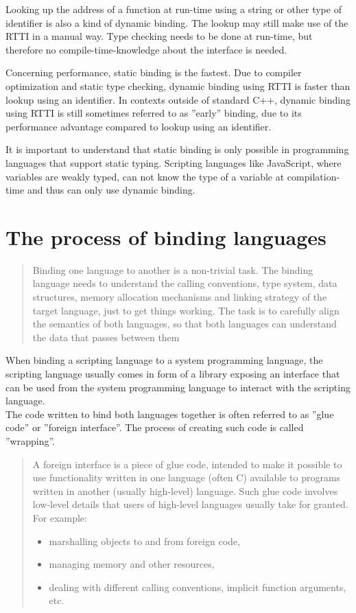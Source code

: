Looking up the address of a function at run-time using a string or other type of identifier is also a kind of dynamic binding. The lookup may still make use of the RTTI in a manual way. Type checking needs to be done at run-time, but therefore no compile-time-knowledge about the interface is needed.

Concerning performance, static binding is the fastest. Due to compiler optimization and static type checking, dynamic binding using RTTI is faster than lookup using an identifier. In contexts outside of standard C++, dynamic binding using RTTI is still sometimes referred to as ''early'' binding, due to its performance advantage compared to lookup using an identifier.

It is important to understand that static binding is only possible in programming languages that support static typing. Scripting languages like JavaScript, where variables are weakly typed, can not know the type of a variable at compilation-time and thus can only use dynamic binding.

\section{The process of binding languages}

\begin{quotation}
Binding one language to another is a non-trivial task. The binding language needs to understand the calling conventions, type system, data structures, memory allocation mechanisms and linking strategy of the target language, just to get things working. The task is to carefully align the semantics of both languages, so that both languages can understand the data that passes between them
\end{quotation}

When binding a scripting language to a system programming language, the scripting language usually comes in form of a library exposing an interface that can be used from the system programming language to interact with the scripting language.\\
The code written to bind both languages together is often referred to as ''glue code'' or ''foreign interface''. The process of creating such code is called ''wrapping''.

\begin{quotation}
A foreign interface is a piece of glue code, intended to make it possible to use functionality written in one language (often C) available to programs written in another (usually high-level) language. Such glue code involves low-level details that users of high-level languages usually take for granted. For example:
\begin{itemize}
\item marshalling objects to and from foreign code,
\item managing memory and other resources,
\item dealing with different calling conventions, implicit function arguments, etc.
\end{itemize}
\end{quotation}


